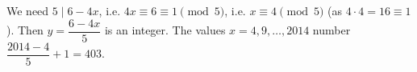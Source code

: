 We need $5\mid6-4x$, i.e. $4x\equiv6\equiv1\pmod5$, i.e. $x\equiv4\pmod5$ (as $4\cdot4=16\equiv1$). Then $y=\dfrac{6-4x}{5}$ is an integer. The values $x=4,9,\dots,2014$ number $\dfrac{2014-4}{5}+1=\boxed{403}$.
